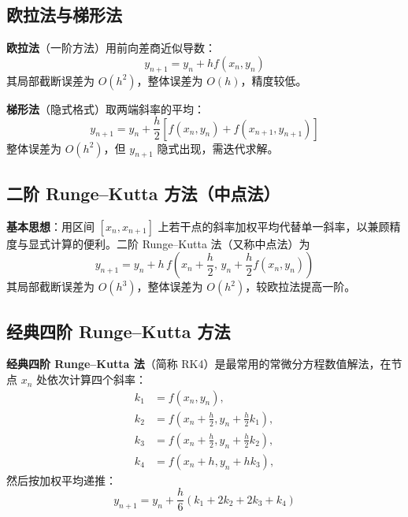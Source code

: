 \subsection{欧拉法与梯形法}

\textbf{欧拉法}（一阶方法）用前向差商近似导数：
\begin{equation}
y_{n+1} = y_n + h f(x_n, y_n) \tag{3.20}
\end{equation}
其局部截断误差为 $O(h^2)$，整体误差为 $O(h)$，精度较低。

\textbf{梯形法}（隐式格式）取两端斜率的平均：
\begin{equation}
y_{n+1} = y_n + \frac{h}{2}\left[f(x_n, y_n) + f(x_{n+1}, y_{n+1})\right] \tag{3.21}
\end{equation}
整体误差为 $O(h^2)$，但 $y_{n+1}$ 隐式出现，需迭代求解。

\subsection{二阶 Runge--Kutta 方法（中点法）}

\textbf{基本思想}：用区间 $[x_n, x_{n+1}]$ 上若干点的斜率加权平均代替单一斜率，以兼顾精度与显式计算的便利。二阶 Runge--Kutta 法（又称中点法）为
\begin{equation}
y_{n+1} = y_n + h\,f\left(x_n + \frac{h}{2},\, y_n + \frac{h}{2}f(x_n, y_n)\right) \tag{3.22}
\end{equation}
其局部截断误差为 $O(h^3)$，整体误差为 $O(h^2)$，较欧拉法提高一阶。

\subsection{经典四阶 Runge--Kutta 方法}

\textbf{经典四阶 Runge--Kutta 法}（简称 RK4）是最常用的常微分方程数值解法，在节点 $x_n$ 处依次计算四个斜率：
\begin{equation}
\begin{aligned}
k_1 &= f(x_n, y_n), \\
k_2 &= f\left(x_n + \frac{h}{2}, y_n + \frac{h}{2}k_1\right), \\
k_3 &= f\left(x_n + \frac{h}{2}, y_n + \frac{h}{2}k_2\right), \\
k_4 &= f(x_n + h, y_n + h k_3),
\end{aligned} \tag{3.23}
\end{equation}
然后按加权平均递推：
\begin{equation}
y_{n+1} = y_n + \frac{h}{6}\left(k_1 + 2k_2 + 2k_3 + k_4\right) \tag{3.24}
\end{equation}

